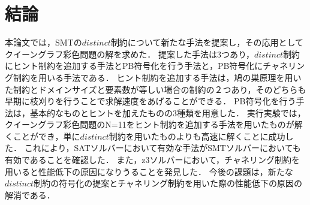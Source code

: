 \chapter{結論}
本論文では，SMTの$distinct$制約について新たな手法を提案し，その応用としてクイーングラフ彩色問題の解を求めた．
提案した手法は3つあり，$distinct$制約にヒント制約を追加する手法とPB符号化を行う手法と，PB符号化にチャネリング制約を用いる手法である．
ヒント制約を追加する手法は，鳩の巣原理を用いた制約とドメインサイズと要素数が等しい場合の制約の２つあり，そのどちらも早期に枝刈りを行うことで求解速度をあげることができる．
PB符号化を行う手法は，基本的なものとヒントを加えたものの3種類を用意した．
実行実験では，クイーングラフ彩色問題のN=11をヒント制約を追加する手法を用いたものが解くことができ，単に$distinct$制約を用いたものよりも高速に解くことに成功した．
これにより，SATソルバーにおいて有効な手法がSMTソルバーにおいても有効であることを確認した．
また，z3ソルバーにおいて，チャネリング制約を用いると性能低下の原因になりうることを発見した．
今後の課題は，新たな$distinct$制約の符号化の提案とチャネリング制約を用いた際の性能低下の原因の解消である．





